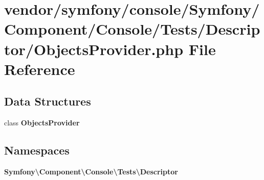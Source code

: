 \section{vendor/symfony/console/\+Symfony/\+Component/\+Console/\+Tests/\+Descriptor/\+Objects\+Provider.php File Reference}
\label{_objects_provider_8php}
\subsection*{Data Structures}
\begin{DoxyCompactItemize}
\item 
class {\bf Objects\+Provider}
\end{DoxyCompactItemize}
\subsection*{Namespaces}
\begin{DoxyCompactItemize}
\item 
 {\bf Symfony\textbackslash{}\+Component\textbackslash{}\+Console\textbackslash{}\+Tests\textbackslash{}\+Descriptor}
\end{DoxyCompactItemize}
